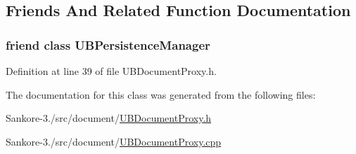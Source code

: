\subsection{Friends And Related Function Documentation}
\hypertarget{class_u_b_document_proxy_a5f897416511abe617c56d086f54e4b3e}{
\subsubsection[{U\-B\-Persistence\-Manager}]{\setlength{\rightskip}{0pt plus 5cm}friend class {\bf U\-B\-Persistence\-Manager}\hspace{0.3cm}{\ttfamily [friend]}}}\label{de/db4/class_u_b_document_proxy_a5f897416511abe617c56d086f54e4b3e}


Definition at line 39 of file U\-B\-Document\-Proxy.\-h.



The documentation for this class was generated from the following files\-:\begin{DoxyCompactItemize}
\item 
Sankore-\/3./src/document/\hyperlink{_u_b_document_proxy_8h}{U\-B\-Document\-Proxy.\-h}\item 
Sankore-\/3./src/document/\hyperlink{_u_b_document_proxy_8cpp}{U\-B\-Document\-Proxy.\-cpp}\end{DoxyCompactItemize}
